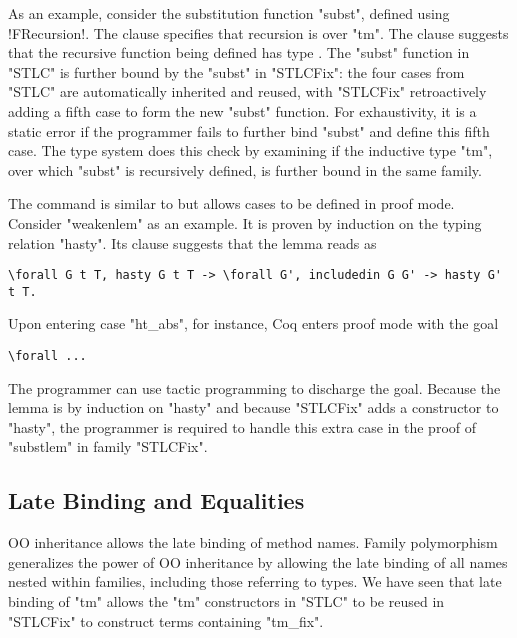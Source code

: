 As an example, consider the substitution function "subst", defined using
\lsti!FRecursion!.
The  clause specifies that recursion is over "tm".
The  clause suggests that the recursive function being
defined has type .
%
The "subst" function in "STLC" is further bound by the "subst" in "STLCFix":
the four cases from "STLC" are automatically inherited and reused,
with "STLCFix" retroactively adding a fifth case to form the new "subst" function.
%
For exhaustivity, it is a static error if the programmer fails to
further bind "subst" and define this fifth case.
The type system does this check by examining if the inductive type "tm",
over which "subst" is recursively defined, is further bound in the same family.

The  command is similar to  but
allows cases to be defined in proof mode.
Consider "weakenlem" as an example.
It is proven by induction on the typing relation "hasty".
Its  clause suggests that the lemma reads as

\begin{lstlisting}[basicstyle=\fontsize{8}{9}\ttfamily]
\forall G t T, hasty G t T -> \forall G', includedin G G' -> hasty G' t T.
\end{lstlisting}

\noindent
Upon entering case "ht_abs", for instance, Coq enters proof mode with the goal

\begin{lstlisting}[basicstyle=\fontsize{8}{9}\ttfamily]
  \forall ...
\end{lstlisting}

\noindent
The programmer can use tactic programming to discharge the goal.
Because the lemma is by induction on "hasty" and because "STLCFix" adds
a constructor to "hasty", the programmer is required to handle this extra case
in the proof of "substlem" in family "STLCFix".


\subsection{Late Binding and Equalities}
\label{sec:latebind}


OO inheritance allows the late binding of method names.
Family polymorphism generalizes the power of OO inheritance by allowing the
late binding of all names nested within families, including those referring to types.
We have seen that late binding of "tm" allows the "tm" constructors in "STLC"
to be reused in "STLCFix" to construct terms containing "tm_fix".

